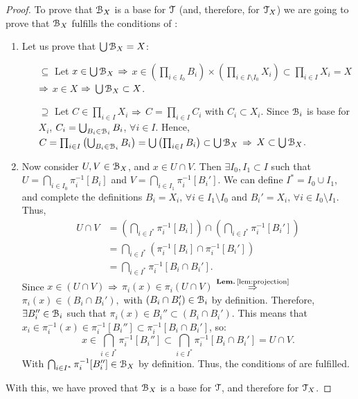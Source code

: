 \begin{proof}
	To prove that $\EuScript{B}_X$ is a base for $\EuScript{T}$ (and, therefore, for $\EuScript{T}_X$) we are going to prove that $\EuScript{B}_X$ fulfills
	the conditions of :
	\begin{enumerate}
		\item Let us prove that $\bigcup\EuScript{B}_X = X$:
		\begin{itemize}
			\item[$\boxed{\subseteq}$] Let $x\in \bigcup\EuScript{B}_X$ $\Rightarrow$ $x\in \left(\prod_{i\in I_0} B_i\right)\times\left(\prod_{i\in I\setminus I_0}X_i\right)\subset\prod_{i\in I} X_i = X$ $\Rightarrow$ $x\in X$ $\Rightarrow$ $\bigcup \EuScript{B}_X\subset X$.
			\item[$\boxed{\supseteq}$] Let $C\in \prod_{i\in I}X_i$ $\Rightarrow$ $C=\prod_{i\in I}C_i$ with $C_i\subset X_i$.
			Since $\EuScript{B}_i$ is base for $X_i$, $C_i=\bigcup_{B_i\in \EuScript{B}_i} B_i$, $\forall i\in I$.
			Hence, $C=\prod_{i\in I}\left(\bigcup_{B_i\in \EuScript{B}_i} B_i\right) = \bigcup \left(\prod_{i\in I} B_i\right) \subset \bigcup \EuScript{B}_X$ $\Rightarrow$ $X\subset \bigcup \EuScript{B}_X$.
		\end{itemize}
		\item Now consider $U,V\in \EuScript{B}_X$, and $x\in U\cap V$. Then $\exists I_0, I_1 \subset I$ such that
		$U=\bigcap_{i\in I_0}\pi^{-1}_i[B_i]$ and $V=\bigcap_{i\in I_1}\pi^{-1}_i[B_i']$.
		We can define $I^*=I_0\cup I_1$, and complete the definitions $B_i=X_i,\,\forall i\in I_1\setminus I_0$ and
		$B_i'=X_i,\,\forall i\in I_0\setminus I_1$.
		Thus,
		\begin{align*}
			U\cap V &= \left(\bigcap_{i\in I^*}\pi^{-1}_i[B_i]\right)\cap\left(\bigcap_{i\in I^*}\pi^{-1}_i[B_i']\right)\\
			&= \bigcap_{i\in I^*}\left(\pi^{-1}_i[B_i]\cap\pi^{-1}_{i}[B_i']\right)\\
			&= \bigcap_{i\in I^*}\pi^{-1}_i[B_i\cap B_i'].
		\end{align*}
		Since $x\in (U\cap V)$ $\Rightarrow$ $\pi_i(x)\in\pi_i(U\cap V)$ $\overset{\lemref{lem:projection}}{\Then}$
		$\pi_i(x)\in (B_i\cap B_i'),$ with $(B_i\cap B_i')\in \EuScript{B}_i$ by definition.
		Therefore, $\exists B_i''\in \EuScript{B}_i$ such that $\pi_i(x)\in B_i''\subset (B_i\cap B_i')$.
		This means that $x_i\in \pi^{-1}_i(x) \in \pi^{-1}_i[B_i'']\subset \pi^{-1}_i[B_i\cap B_i']$,
		so:
		$$
		 x\in \bigcap_{i\in I^*}\pi^{-1}_i[B_i'']\subset \bigcap_{i\in I^*}\pi^{-1}_i[B_i\cap B_i'] = U\cap V.
		$$
		With $\bigcap_{i\in I^*}\pi^{-1}_i[B_i'']\in \EuScript{B}_X$ by definition.
		Thus, the conditions of  are fulfilled.
	\end{enumerate}
	With this, we have proved that $\EuScript{B}_X$ is a base for $\EuScript{T}$, and therefore for $\EuScript{T}_X$.
\end{proof}

